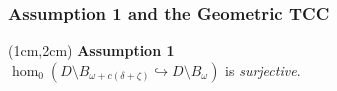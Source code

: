 \begin{frame}
  \frametitle{{\small Assumption 1 and the Geometric TCC}}

  \begin{textblock*}{11cm}(1cm,2cm)
    \textbf{Assumption 1}\\ $\hom_0(D\setminus B_{\omega+c(\delta+\zeta)}\hookrightarrow D\setminus B_\omega)$ is \emph{surjective}.
  \end{textblock*}


\end{frame}
